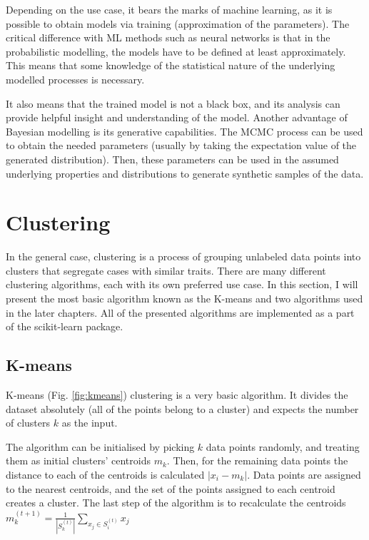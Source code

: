 Depending on the use case, it bears the marks of machine learning, as it is possible to obtain models via training (approximation of the parameters).
The critical difference with ML methods such as neural networks is that in the probabilistic modelling, the models have to be defined at least approximately.
This means that some knowledge of the statistical nature of the underlying modelled processes is necessary.

It also means that the trained model is not a black box, and its analysis can provide helpful insight and understanding of the model.
Another advantage of Bayesian modelling is its generative capabilities.
The MCMC process can be used to obtain the needed parameters (usually by taking the expectation value of the generated distribution).
Then, these parameters can be used in the assumed underlying properties and distributions to generate synthetic samples of the data.

\section{Clustering}
\label{sec:clustering}

In the general case, clustering is a process of grouping unlabeled data points into clusters that segregate cases with similar traits. There are many different clustering algorithms, each with its own preferred use case. In this section, I will present the most basic algorithm known as the K-means and two algorithms used in the later chapters. All of the presented algorithms are implemented as a part of the scikit-learn \cite{scikit-learn} package.

\subsection{K-means}

K-means (Fig. \ref{fig:kmeans}) clustering is a very basic algorithm. It divides the dataset absolutely (all of the points belong to a cluster) and expects the number of clusters $k$ as the input.

The algorithm can be initialised by picking $k$ data points randomly, and treating them as initial clusters' centroids $m_{k}$.
Then, for the remaining data points the distance to each of the centroids is calculated $|x_{i} - m_{k}|$.
Data points are assigned to the nearest centroids, and the set of the points assigned to each centroid creates a cluster.
The last step of the algorithm is to recalculate the centroids $m^{(t+1)}_k = \frac{1}{\left|S^{(t)}_k\right|} \sum_{x_j \in S^{(t)}_i} x_j $

